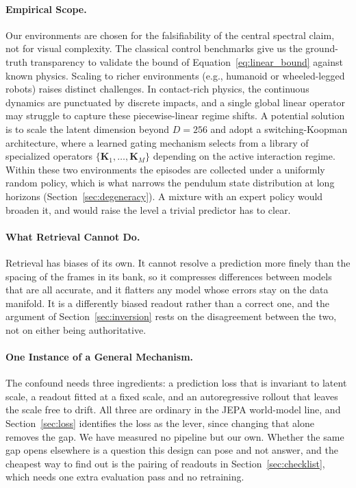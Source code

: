 \documentclass[10pt]{article} %
\newcommand{\K}{\mathbf{K}}
\begin{document}
\paragraph{Empirical Scope.}
Our environments are chosen for the falsifiability of the central spectral claim, not for visual complexity. The classical control benchmarks give us the ground-truth transparency to validate the bound of Equation~\ref{eq:linear_bound} against known physics. Scaling to richer environments (e.g., humanoid or wheeled-legged robots) raises distinct challenges. In contact-rich physics, the continuous dynamics are punctuated by discrete impacts, and a single global linear operator may struggle to capture these piecewise-linear regime shifts. A potential solution is to scale the latent dimension beyond $D{=}256$ and adopt a switching-Koopman architecture, where a learned gating mechanism selects from a library of specialized operators $\{\K_1, \dots, \K_M\}$ depending on the active interaction regime. Within these two environments the episodes are collected under a uniformly random policy, which is what narrows the pendulum state distribution at long horizons (Section~\ref{sec:degeneracy}). A mixture with an expert policy would broaden it, and would raise the level a trivial predictor has to clear.
\paragraph{What Retrieval Cannot Do.}
Retrieval has biases of its own. It cannot resolve a prediction more finely than the spacing of the frames in its bank, so it compresses differences between models that are all accurate, and it flatters any model whose errors stay on the data manifold. It is a differently biased readout rather than a correct one, and the argument of Section~\ref{sec:inversion} rests on the disagreement between the two, not on either being authoritative.

\paragraph{One Instance of a General Mechanism.}
The confound needs three ingredients: a prediction loss that is invariant to latent scale, a readout fitted at a fixed scale, and an autoregressive rollout that leaves the scale free to drift. All three are ordinary in the JEPA world-model line, and Section~\ref{sec:loss} identifies the loss as the lever, since changing that alone removes the gap. We have measured no pipeline but our own. Whether the same gap opens elsewhere is a question this design can pose and not answer, and the cheapest way to find out is the pairing of readouts in Section~\ref{sec:checklist}, which needs one extra evaluation pass and no retraining.
\end{document}
